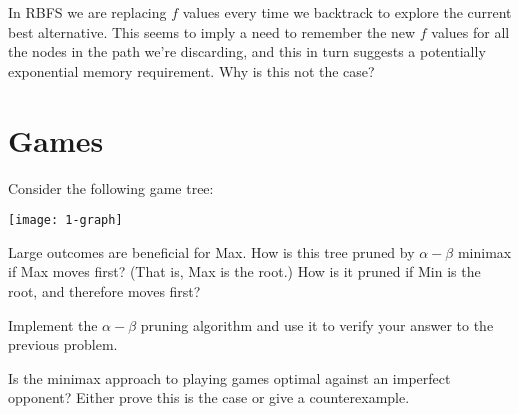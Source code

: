 \documentclass{supervision}
\begin{document}
\begin{questions}

    \question In RBFS we are replacing $f$ values every time we backtrack to
      explore the current best alternative. This seems to imply a need to
      remember the new $f$ values for all the nodes in the path we're
      discarding, and this in turn suggests a potentially exponential memory
      requirement. Why is this not the case?

    \section*{Games}

    \question Consider the following game tree:
      \begin{center}
        \texttt{[image: 1-graph]}
      \end{center}

      Large outcomes are beneficial for Max. How is this tree pruned by $\alpha
      - \beta$ minimax if Max moves first? (That is, Max is the root.) How is it
      pruned if Min is the root, and therefore moves first?

    \question Implement the $\alpha - \beta$ pruning algorithm and use it to
      verify your answer to the previous problem.

    \question Is the minimax approach to playing games optimal against an
      imperfect opponent? Either prove this is the case or give a
      counterexample.

  \end{questions}
\end{document}
